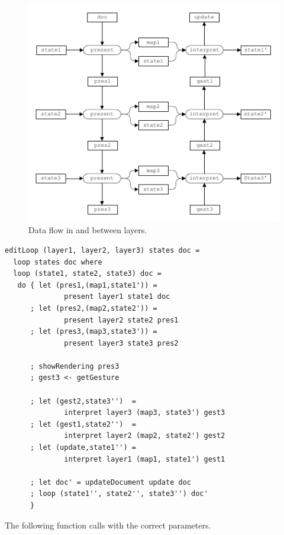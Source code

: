 \documentclass[preprint,natbib]{sigplanconf}
\begin{document}
\begin{figure}
\includegraphics[width=\columnwidth]{images/LayersDataFlow}
\caption{Data flow in and between layers.} \label{explicit} 
\end{figure}

\begin{small}
\begin{verbatim}
editLoop (layer1, layer2, layer3) states doc = 
  loop states doc where
  loop (state1, state2, state3) doc = 
   do { let (pres1,(map1,state1')) = 
              present layer1 state1 doc
      ; let (pres2,(map2,state2')) = 
              present layer2 state2 pres1
      ; let (pres3,(map3,state3')) = 
              present layer3 state3 pres2

      ; showRendering pres3
      ; gest3 <- getGesture

      ; let (gest2,state3'')  = 
              interpret layer3 (map3, state3') gest3
      ; let (gest1,state2'')  =
              interpret layer2 (map2, state2') gest2
      ; let (update,state1'') = 
              interpret layer1 (map1, state1') gest1
      
      ; let doc' = updateDocument update doc
      ; loop (state1'', state2'', state3'') doc'
      }
\end{verbatim}
\end{small}

The following function  calls  with the correct parameters.
\end{document}
